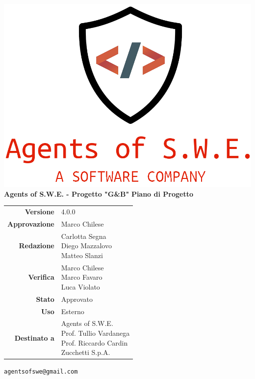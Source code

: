 


\usepackage{graphicx}

\renewcommand{\listtablename}{Indice delle Tabelle}
\renewcommand{\listfigurename}{Indice di Figure e Grafici}



\begin{titlepage}
\thispagestyle{empty}

\begin{center}
\includegraphics[scale=0.3]{./images/logo.png}\\
\large \textbf{Agents of S.W.E. - Progetto "G\&B"}
\vfill
\Huge \textbf{Piano di Progetto}
\vfill
\large
\renewcommand{\arraystretch}{1.3}
\begin{tabular}{r|l}


\textbf{Versione} & 4.0.0\\
\textbf{Approvazione} & Marco Chilese\\
\textbf{Redazione} & \parbox[t]{5cm}{Carlotta Segna\\Diego Mazzalovo\\Matteo Slanzi}\\
\textbf{Verifica} & \parbox[t]{5cm}{Marco Chilese \\ Marco Favaro\\Luca Violato}\\
\textbf{Stato} & Approvato\\
\textbf{Uso} & Esterno\\
\textbf{Destinato a} & \parbox[t]{5cm}{Agents of S.W.E. \\Prof. Tullio Vardanega\\Prof. Riccardo Cardin \\ Zucchetti S.p.A.}
\end{tabular}
\vfill
\small
\texttt{agentsofswe@gmail.com}
\end{center}
\end{titlepage}

